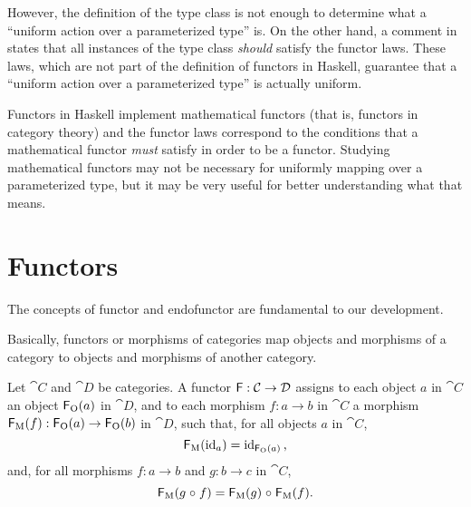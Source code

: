 However, the definition of the  type class is not 
enough to determine what a ``uniform action over a parameterized
type'' is. On the other hand, a comment in \parencite[p.
  88]{peytonjones-2003} states that all instances of the
 type class \emph{should} satisfy the functor
laws. These laws, which are not part of the definition of functors in
Haskell, guarantee that a ``uniform action over a parameterized type''
is actually uniform.

Functors in Haskell implement mathematical functors (that is, functors
in category theory) and the functor laws correspond to the conditions
that a mathematical functor \emph{must} satisfy in order to be a
functor. Studying mathematical functors may not be necessary for
uniformly mapping over a parameterized type, but it may be very useful
for better understanding what that means.

\section{Functors}
\label{sec:functors}

The concepts of functor and endofunctor are fundamental to our
development.

Basically, functors or morphisms of categories map objects and
morphisms of a category to objects and morphisms of another category.

\begin{definition}
  \label{def:functor}


  Let $\cat{C}$ and $\cat{D}$ be categories. A functor $\mathsf{F}:
  \mathcal{C} \to \mathcal{D}$ assigns to each object $a$ in $\cat{C}$ an
  object $\mathsf{F}_{\operatorname{O}}(a)$ in $\cat{D}$, and to each morphism $f: a \to
  b$ in $\cat{C}$ a morphism $\mathsf{F}_{\operatorname{M}}(f): \mathsf{F}_{\operatorname{O}}(a) \to
  \mathsf{F}_{\operatorname{O}}(b)$ in $\cat{D}$, such that, for all objects $a$ in
  $\cat{C}$,
  \begin{equation}
    \label{eq:functor-identity}
    \mathsf{F}_{\operatorname{M}}(\operatorname{id}_{a}) = \operatorname{id}_{\mathsf{F}_{\operatorname{O}}(a)}
    \text{,}
  \end{equation}
  and, for all morphisms $f: a \to b$ and $g: b \to c$ in $\cat{C}$,
  \begin{equation}
    \label{eq:functor-composition}
    \mathsf{F}_{\operatorname{M}}(g \mathrel{\circ} f) = \mathsf{F}_{\operatorname{M}}(g) \mathrel{\circ} \mathsf{F}_{\operatorname{M}}(f)
    \text{.}
  \end{equation}

\end{definition}

